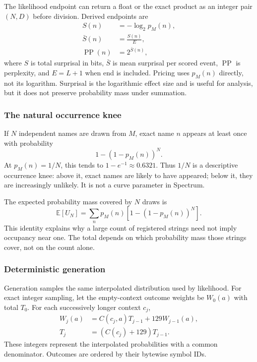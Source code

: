 \documentclass[10pt,twocolumn]{article}
\newcommand{\E}{\mathbb{E}}
\begin{document}
The likelihood endpoint can return a float or the exact product as an integer
pair $(N,D)$ before division. Derived endpoints are
\begin{align*}
  S(n) &= -\log_2 p_M(n),\\
  \bar S(n) &= \frac{S(n)}{E},\\
  \operatorname{PP}(n) &= 2^{\bar S(n)},
\end{align*}
where $S$ is total surprisal in bits, $\bar S$ is mean surprisal per scored
event, $\operatorname{PP}$ is perplexity, and $E=L+1$ when end is included.
Pricing uses $p_M(n)$ directly, not its logarithm. Surprisal is the logarithmic
effect size and is useful for analysis, but it does not preserve probability
mass under summation.

\subsubsection{The natural occurrence knee}

If $N$ independent names are drawn from $M$, exact name $n$ appears at least
once with probability
\[
  1-(1-p_M(n))^N.
\]
At $p_M(n)=1/N$, this tends to $1-e^{-1}\approx0.6321$. Thus $1/N$ is a
descriptive occurrence knee: above it, exact names are likely to have appeared;
below it, they are increasingly unlikely. It is not a curve parameter in
Spectrum.

The expected probability mass covered by $N$ draws is
\[
  \E[U_N]=\sum_n p_M(n)\left[1-(1-p_M(n))^N\right].
\]
This identity explains why a large count of registered strings need not imply
occupancy near one. The total depends on which probability mass those strings
cover, not on the count alone.

\subsubsection{Deterministic generation}

Generation samples the same interpolated distribution used by likelihood.
For exact integer sampling, let the empty-context outcome weights be $W_0(a)$
with total $T_0$. For each successively longer context $c_j$,
\begin{align*}
  W_j(a) &= C(c_j,a)T_{j-1}+129W_{j-1}(a),\\
  T_j &= \left(C(c_j)+129\right)T_{j-1}.
\end{align*}
These integers represent the interpolated probabilities with a common
denominator. Outcomes are ordered by their bytewise symbol IDs.
\end{document}

